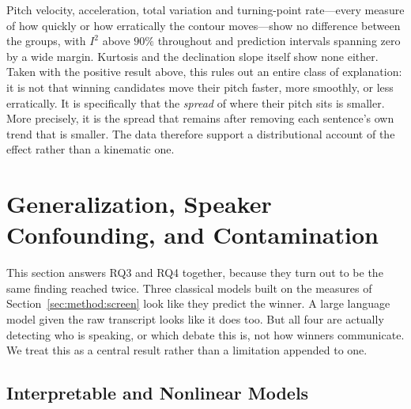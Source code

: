 \documentclass[pdflatex,sn-mathphys-num]{sn-jnl}%
\begin{document}
Pitch velocity, acceleration, total variation and turning-point rate---every
measure of how quickly or how erratically the contour moves---show no
difference between the groups, with $I^2$ above $90\%$ throughout and
prediction intervals spanning zero by a wide margin. Kurtosis and the
declination slope itself show none either. Taken with the positive result
above, this rules out an entire class of explanation: it is not that
winning candidates move their pitch faster, more smoothly, or less
erratically. It is specifically that the \emph{spread} of where their pitch
sits is smaller. More precisely, it is the spread that remains after
removing each sentence's own trend that is smaller. The data therefore support a
distributional account of the effect rather than a kinematic one.

\section{Generalization, Speaker Confounding, and Contamination}
\label{sec:method:generalise}

This section answers RQ3 and RQ4 together, because they turn out to be the
same finding reached twice. Three classical models built on the measures of
Section~\ref{sec:method:screen} look like they predict the winner. A large
language model given the raw transcript looks like it does too. But all four
are actually detecting who is speaking, or which debate this is, not how
winners communicate. We treat this as a central result rather than a
limitation appended to one.

\subsection{Interpretable and Nonlinear Models}
\label{sec:method:combined}
\end{document}
